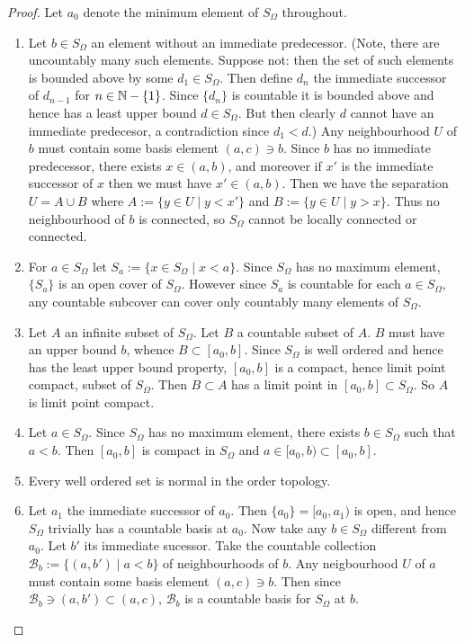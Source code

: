 \begin{proof}
  Let $a_0$ denote the minimum element of $S_\Omega$ throughout.
  \begin{enumerate}[leftmargin=*]
  \item Let $b \in S_{\Omega}$ an element without an immediate predecessor. (Note, there are uncountably many such elements. Suppose not: then the set of such elements is bounded above by some $d_1 \in S_{\Omega}$. Then define $d_n$ the immediate successor of $d_{n-1}$ for $n \in \mathbb{N} - \{1\}$. Since $\{d_n\}$ is countable it is bounded above and hence has a least upper bound $d \in S_{\Omega}$. But then clearly $d$ cannot have an immediate predecesor, a contradiction since $d_1 < d$.) Any neighbourhood $U$ of $b$ must contain some basis element $(a,c) \ni b$. Since $b$ has no immediate predecessor, there exists $x \in (a,b)$, and moreover if $x'$ is the immediate successor of $x$ then we must have $x' \in (a,b)$. Then we have the separation $U = A \cup B$ where $A := \{y \in U \mid y < x'\}$ and $B := \{y \in U \mid y > x\}$. Thus no neighbourhood of $b$ is connected, so $S_\Omega$ cannot be locally connected or connected.
  \item For $a \in S_{\Omega}$ let $S_a := \{x \in S_\Omega \mid x < a\}$. Since $S_\Omega$ has no maximum element, $\{S_a\}$ is an open cover of $S_{\Omega}$. However since $S_a$ is countable for each $a \in S_\Omega$, any countable subcover can cover only countably many elements of $S_\Omega$.
  \item Let $A$ an infinite subset of $S_\Omega$. Let $B$ a countable subset of $A$. $B$ must have an upper bound $b$, whence $B \subset [a_0,b]$. Since $S_\Omega$ is well ordered and hence has the least upper bound property, $[a_0,b]$ is a compact, hence limit point compact, subset of $S_\Omega$. Then $B \subset A$ has a limit point in $[a_0,b] \subset S_\Omega$. So $A$ is limit point compact.
  \item Let $a \in S_\Omega$. Since $S_\Omega$ has no maximum element, there exists $b \in S_\Omega$ such that $a < b$. Then $[a_0,b]$ is compact in $S_\Omega$ and $a \in [a_0,b) \subset [a_0,b]$.
  \item Every well ordered set is normal in the order topology.
  \item Let $a_1$ the immediate successor of $a_0$. Then $\{a_0\} = [a_0,a_1)$ is open, and hence $S_\Omega$ trivially has a countable basis at $a_0$. Now take any $b \in S_\Omega$ different from $a_0$. Let $b'$ its immediate sucessor. Take the countable collection $\mathcal B_b := \{(a, b') \mid a < b\}$ of neighbourhoods of $b$. Any neigbourhood $U$ of $a$ must contain some basis element $(a, c) \ni b$. Then since $\mathcal B_b \ni (a,b') \subset (a,c)$, $\mathcal B_b$ is a countable basis for $S_\Omega$ at $b$.

\end{enumerate}
\end{proof}
